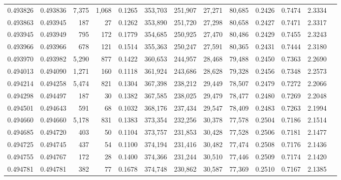 \begin{tabular}{rrrrrrrrrrrrr}
0.493826 & 0.493836 & 7,375 & 1,068 &                                     0.1265 & 353,703 & 251,907 &  27,271 &  80,685 & 0.2426 & 0.7474 & 2.3334 \\
0.493863 & 0.493945 &   187 &    27 &                                     0.1262 & 353,890 & 251,720 &  27,298 &  80,658 & 0.2427 & 0.7471 & 2.3317 \\
0.493945 & 0.493949 &   795 &   172 &                                     0.1779 & 354,685 & 250,925 &  27,470 &  80,486 & 0.2429 & 0.7455 & 2.3243 \\
0.493966 & 0.493966 &   678 &   121 &                                     0.1514 & 355,363 & 250,247 &  27,591 &  80,365 & 0.2431 & 0.7444 & 2.3180 \\
0.493970 & 0.493982 & 5,290 &   877 &                                     0.1422 & 360,653 & 244,957 &  28,468 &  79,488 & 0.2450 & 0.7363 & 2.2690 \\
0.494013 & 0.494090 & 1,271 &   160 &                                     0.1118 & 361,924 & 243,686 &  28,628 &  79,328 & 0.2456 & 0.7348 & 2.2573 \\
0.494214 & 0.494258 & 5,474 &   821 &                                     0.1304 & 367,398 & 238,212 &  29,449 &  78,507 & 0.2479 & 0.7272 & 2.2066 \\
0.494298 & 0.494497 &   187 &    30 &                                     0.1382 & 367,585 & 238,025 &  29,479 &  78,477 & 0.2480 & 0.7269 & 2.2048 \\
0.494501 & 0.494643 &   591 &    68 &                                     0.1032 & 368,176 & 237,434 &  29,547 &  78,409 & 0.2483 & 0.7263 & 2.1994 \\
0.494660 & 0.494660 & 5,178 &   831 &                                     0.1383 & 373,354 & 232,256 &  30,378 &  77,578 & 0.2504 & 0.7186 & 2.1514 \\
0.494685 & 0.494720 &   403 &    50 &                                     0.1104 & 373,757 & 231,853 &  30,428 &  77,528 & 0.2506 & 0.7181 & 2.1477 \\
0.494725 & 0.494745 &   437 &    54 &                                     0.1100 & 374,194 & 231,416 &  30,482 &  77,474 & 0.2508 & 0.7176 & 2.1436 \\
0.494755 & 0.494767 &   172 &    28 &                                     0.1400 & 374,366 & 231,244 &  30,510 &  77,446 & 0.2509 & 0.7174 & 2.1420 \\
0.494781 & 0.494781 &   382 &    77 &                                     0.1678 & 374,748 & 230,862 &  30,587 &  77,369 & 0.2510 & 0.7167 & 2.1385 \\

\end{tabular}

